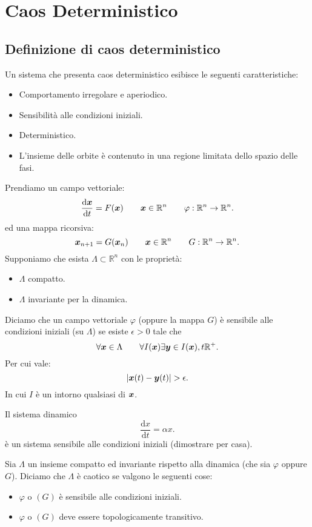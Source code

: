 \section{Caos Deterministico}%
\subsection{Definizione di caos deterministico}%
Un sistema che presenta caos deterministico esibisce le seguenti caratteristiche:
\begin{itemize}
    \item Comportamento irregolare e aperiodico.
    \item Sensibilità alle condizioni iniziali.
    \item Deterministico.
    \item L'insieme delle orbite è contenuto in una regione limitata dello spazio delle fasi.
\end{itemize}
Prendiamo un campo vettoriale:
\[
    \frac{\text{d} \boldsymbol{x}}{\text{d} t} = F(\boldsymbol{x}) \qquad  \boldsymbol{x}\in \mathbb{R}^n \qquad  \varphi :\mathbb{R}^n\to \mathbb{R}^n
.\] 
ed una mappa ricorsiva:
\[
    \boldsymbol{x}_{n+1}=G(\boldsymbol{x}_n) \qquad  \boldsymbol{x}\in \mathbb{R}^n \qquad  G:\mathbb{R}^n\to \mathbb{R}^n
.\] 
Supponiamo che esista $\Lambda \subset \mathbb{R}^n$ con le proprietà:
\begin{itemize}
    \item $\Lambda$ compatto.
    \item $\Lambda$ invariante per la dinamica.
\end{itemize}
\begin{defn}
    Diciamo che un campo vettoriale $\varphi$ (oppure la mappa $G$) è sensibile alle condizioni iniziali (su $\Lambda$) se esiste $\epsilon >0$ tale che
    \[
	\forall \boldsymbol{x}\in \Lambda\qquad  \forall I(\boldsymbol{x}) \exists \boldsymbol{y} \in I(\boldsymbol{x}), t \mathbb{R}^+ 
    .\] 
    Per cui vale:
    \[
	\left|\v{x}(t) - \v{y}(t) \right|>\epsilon
    .\] 
    In cui $I$ è un intorno qualsiasi di $\boldsymbol{x}$.
\end{defn}
\noindent
\begin{exmp}
    \label{exmp:15_1}
    Il sistema dinamico
    \[
        \frac{\text{d} x}{\text{d} t} = \alpha  x
    .\] è un sistema sensibile alle condizioni iniziali (dimostrare per casa).
\end{exmp}
\noindent
\begin{defn}
    Sia $\Lambda$ un insieme compatto ed invariante rispetto alla dinamica (che sia $\varphi$ oppure $G$). Diciamo che $\Lambda$ è caotico se valgono le seguenti cose:
    \begin{itemize}
	\item $\varphi$ o $ (G) $ è sensibile alle condizioni iniziali.
	\item $\varphi$ o $ (G) $ deve essere topologicamente transitivo.
    \end{itemize}
\end{defn}
